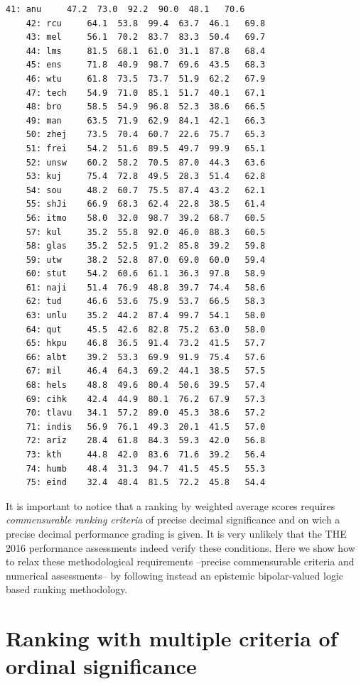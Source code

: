 \begin{lstlisting}[caption={Printing the ranked performance table},label=list:13.5]
    41: anu 	47.2  73.0  92.2  90.0  48.1   70.6
    42: rcu 	64.1  53.8  99.4  63.7  46.1   69.8
    43: mel 	56.1  70.2  83.7  83.3  50.4   69.7
    44: lms 	81.5  68.1  61.0  31.1  87.8   68.4
    45: ens 	71.8  40.9  98.7  69.6  43.5   68.3
    46: wtu 	61.8  73.5  73.7  51.9  62.2   67.9
    47: tech 	54.9  71.0  85.1  51.7  40.1   67.1
    48: bro 	58.5  54.9  96.8  52.3  38.6   66.5
    49: man 	63.5  71.9  62.9  84.1  42.1   66.3
    50: zhej 	73.5  70.4  60.7  22.6  75.7   65.3
    51: frei 	54.2  51.6  89.5  49.7  99.9   65.1
    52: unsw 	60.2  58.2  70.5  87.0  44.3   63.6
    53: kuj 	75.4  72.8  49.5  28.3  51.4   62.8
    54: sou 	48.2  60.7  75.5  87.4  43.2   62.1
    55: shJi 	66.9  68.3  62.4  22.8  38.5   61.4
    56: itmo 	58.0  32.0  98.7  39.2  68.7   60.5
    57: kul 	35.2  55.8  92.0  46.0  88.3   60.5
    58: glas 	35.2  52.5  91.2  85.8  39.2   59.8
    59: utw 	38.2  52.8  87.0  69.0  60.0   59.4
    60: stut 	54.2  60.6  61.1  36.3  97.8   58.9
    61: naji 	51.4  76.9  48.8  39.7  74.4   58.6
    62: tud 	46.6  53.6  75.9  53.7  66.5   58.3
    63: unlu 	35.2  44.2  87.4  99.7  54.1   58.0
    64: qut 	45.5  42.6  82.8  75.2  63.0   58.0
    65: hkpu 	46.8  36.5  91.4  73.2  41.5   57.7
    66: albt 	39.2  53.3  69.9  91.9  75.4   57.6
    67: mil 	46.4  64.3  69.2  44.1  38.5   57.5
    68: hels 	48.8  49.6  80.4  50.6  39.5   57.4
    69: cihk 	42.4  44.9  80.1  76.2  67.9   57.3
    70: tlavu 	34.1  57.2  89.0  45.3  38.6   57.2
    71: indis 	56.9  76.1  49.3  20.1  41.5   57.0
    72: ariz 	28.4  61.8  84.3  59.3  42.0   56.8
    73: kth 	44.8  42.0  83.6  71.6  39.2   56.4
    74: humb 	48.4  31.3  94.7  41.5  45.5   55.3
    75: eind 	32.4  48.4  81.5  72.2  45.8   54.4
\end{lstlisting}

It is important to notice that a ranking by weighted average scores requires \emph{commensurable ranking criteria} of precise decimal significance and on wich a precise decimal performance grading is given. It is very unlikely that the THE 2016 performance assessments indeed verify these conditions. Here we show how to relax these methodological requirements --precise commensurable criteria and numerical assessments-- by following instead an epistemic bipolar-valued logic based ranking methodology.

\section{Ranking with multiple criteria of ordinal significance}
\label{sec:13.2}

